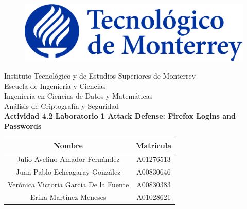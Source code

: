 \documentclass{article}
\begin{document}
    \begin{titlepage}
        \begin{center}
            \begin{figure}
                \centering
                \includegraphics[scale=0.13]{../../img/logo_itesm.png}\\ %
            \end{figure}
            \vspace{5cm}
            \LARGE{Instituto Tecnológico y de Estudios Superiores de Monterrey}\\
            \vspace{1cm}
            \large Escuela de Ingeniería y Ciencias \\
            \vspace{0.2cm}
            \large Ingeniería en Ciencias de Datos y Matemáticas \\
            \vspace{0.2cm}
            \large Análisis de Criptografía y Seguridad\\
            \vspace{1cm}
            \textbf{Actividad 4.2 Laboratorio 1 Attack Defense: Firefox Logins and Passwords}\\ %
            \vspace{0.7cm}
            \begin{table}[h!]
                \centering
                \begin{tabular}{ ||c|c|| }
                    \hline
                    Nombre & Matrícula \\
                    \hline
                    Julio Avelino Amador Fernández & A01276513 \\
                    \hline
                    Juan Pablo Echeagaray González & A00830646 \\
                    \hline
                    Verónica Victoria García De la Fuente & A00830383 \\
                    \hline
                    Erika Martínez Meneses & A01028621 \\

\end{tabular}
\end{table}
\end{center}
\end{titlepage}
\end{document}
